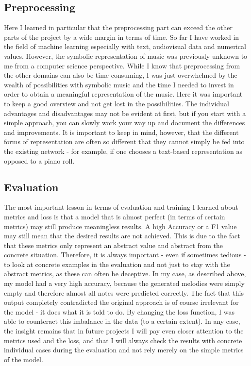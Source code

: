 \documentclass[a4paper, 10pt, xcolor=dvipsnames]{article} %
\begin{document}
\subsection{Preprocessing}
Here I learned in particular that the preprocessing part can
exceed the other parts of the project by a wide margin in terms of time. So far
I have worked in the field of machine learning especially with text,
audiovisual data and numerical values. However, the symbolic representation of
music was previously unknown to me from a computer science perspective. While I
know that preprocessing from the other domains can also be time consuming, I
was just overwhelmed by the wealth of possibilities with symbolic music and the
time I needed to invest in order to obtain a meaningful representation of the
music. Here it was important to keep a good overview and not get lost in the
possibilities. The individual advantages and disadvantages may not be evident
at first, but if you start with a simple approach, you can slowly work your way
up and document the differences and improvements. It is important to keep in
mind, however, that the different forms of representation are often so
different that they cannot simply be fed into the existing network - for
example, if one chooses a text-based representation as opposed to a piano roll.

\subsection{Evaluation}
The most important lesson in terms of evaluation and training I learned about
metrics and loss is that a model that is almost perfect (in terms of certain
metrics) may still produce meaningless results. A high Accuracy or a F1 value
may still mean that the desired results are not achieved. This is due to the
fact that these metrics only represent an abstract value and abstract from the
concrete situation. Therefore, it is always important - even if sometimes
tedious - to look at concrete examples in the evaluation and not just to stay
with the abstract metrics, as these can often be deceptive. In my case, as
described above, my model had a very high accuracy, because the generated
melodies were simply empty and therefore almost all notes were predicted
correctly. The fact that this output completely contradicted the original
approach is of course irrelevant for the model - it does what it is told to do.
By changing the loss function, I was able to counteract this imbalance in the
data (to a certain extent). In any case, the insight remains that in future
projects I will pay even closer attention to the metrics used and the loss, and
that I will always check the results with concrete individual cases during the
evaluation and not rely merely on the simple metrics of the model.
\end{document}
